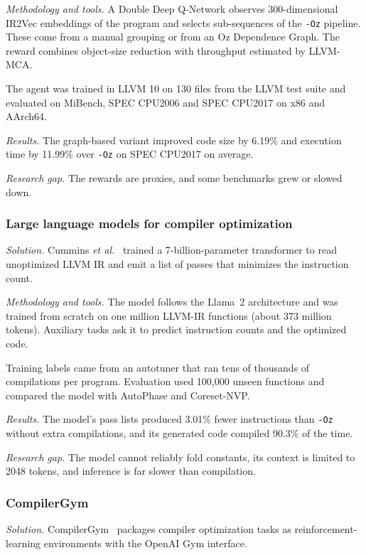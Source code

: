 \documentclass{ieeeaccess}
\begin{document}
\textit{Methodology and tools.} A Double Deep Q-Network observes 300-dimensional IR2Vec embeddings of the program and selects sub-sequences of the \texttt{-Oz} pipeline. These come from a manual grouping or from an Oz Dependence Graph. The reward combines object-size reduction with throughput estimated by LLVM-MCA.

The agent was trained in LLVM 10 on 130 files from the LLVM test suite and evaluated on MiBench, SPEC CPU2006 and SPEC CPU2017 on x86 and AArch64.

\textit{Results.} The graph-based variant improved code size by 6.19\% and execution time by 11.99\% over \texttt{-Oz} on SPEC CPU2017 on average.

\textit{Research gap.} The rewards are proxies, and some benchmarks grew or slowed down.

\subsubsection{Large language models for compiler optimization}
\textit{Solution.} Cummins \textit{et al.}~\cite{cummins2023llm} trained a 7-billion-parameter transformer to read unoptimized LLVM IR and emit a list of passes that minimizes the instruction count.

\textit{Methodology and tools.} The model follows the Llama~2 architecture and was trained from scratch on one million LLVM-IR functions (about 373 million tokens). Auxiliary tasks ask it to predict instruction counts and the optimized code.

Training labels came from an autotuner that ran tens of thousands of compilations per program. Evaluation used 100,000 unseen functions and compared the model with AutoPhase and Coreset-NVP.

\textit{Results.} The model's pass lists produced 3.01\% fewer instructions than \texttt{-Oz} without extra compilations, and its generated code compiled 90.3\% of the time.

\textit{Research gap.} The model cannot reliably fold constants, its context is limited to 2048 tokens, and inference is far slower than compilation.

\subsubsection{CompilerGym}
\textit{Solution.} CompilerGym~\cite{cummins2021compilergym} packages compiler optimization tasks as reinforcement-learning environments with the OpenAI Gym interface.
\end{document}
